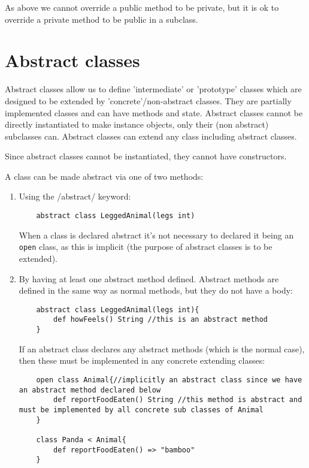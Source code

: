 \documentclass[conc-doc]{subfiles}
\begin{document}
As above we cannot override a public method to be private, but it is ok to override a private method to be public in a subclass.


\section{Abstract classes}
Abstract classes allow us to define 'intermediate' or 'prototype' classes which are designed to be extended by 'concrete'/non-abstract classes. They are partially implemented classes and can have methods and state. Abstract classes cannot be directly instantiated to make instance objects, only their (non abstract) subclasses can. Abstract classes can extend any class including abstract classes.

Since abstract classes cannot be instantiated, they cannot have constructors. 

A class can be made abstract via one of two methods:
\begin{enumerate}
	\item Using the /abstract/ keyword:
	\begin{lstlisting}
	abstract class LeggedAnimal(legs int)
	\end{lstlisting}

	When a class is declared abstract it's not necessary to declared it being an \lstinline{open} class, as this is implicit (the purpose of abstract classes is to be extended).

	\item By having at least one abstract method defined. Abstract methods are defined in the same way as normal methods, but they do not have a body:
	\begin{lstlisting}
	abstract class LeggedAnimal(legs int){
		def howFeels() String //this is an abstract method
	}
	\end{lstlisting}
	
	If an abstract class declares any abstract methods (which is the normal case), then these must be implemented in any concrete extending classes:
	
	\begin{lstlisting}
	open class Animal{//implicitly an abstract class since we have an abstract method declared below
		def reportFoodEaten() String //this method is abstract and must be implemented by all concrete sub classes of Animal
	}
	
	class Panda < Animal{
		def reportFoodEaten() => "bamboo"
	}
	\end{lstlisting}
\end{enumerate}
\end{document}
